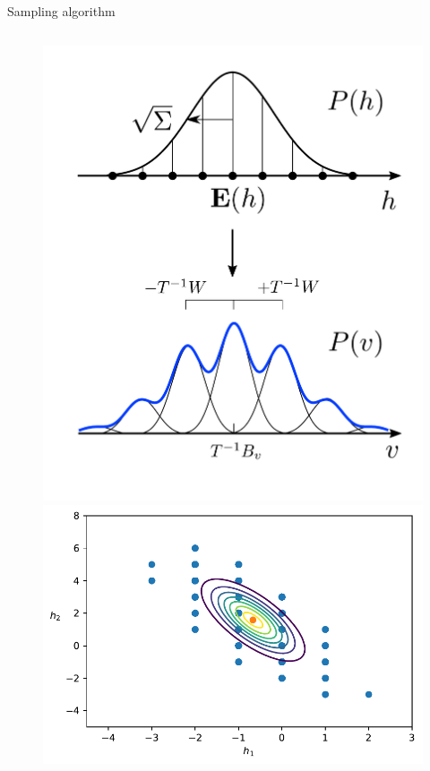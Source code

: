 \documentclass[10pt]{beamer}
\begin{document}
\begin{frame}{Sampling algorithm}
\begin{columns}
\begin{column}[]{0.4 \textwidth}
\begin{figure}[t!]
\begin{center}
                \includegraphics[scale=0.25]{figures/interpretation.pdf}
                \includegraphics[scale=0.25]{figures/radius_interpretation.pdf}
        

\end{center}
\end{figure}
\end{column}
\end{columns}
\end{frame}
\end{document}
